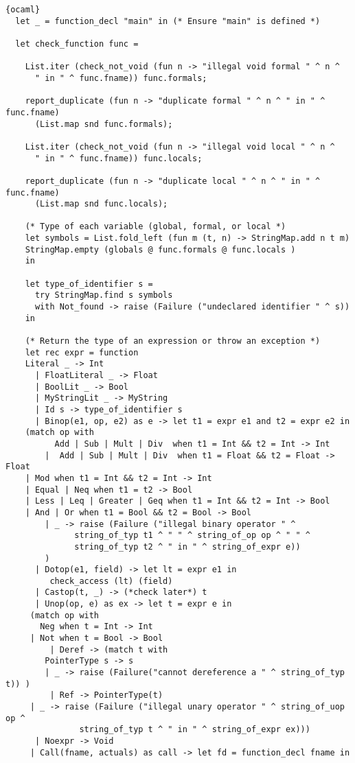\begin{lstlisting}{ocaml}
  let _ = function_decl "main" in (* Ensure "main" is defined *)

  let check_function func =

    List.iter (check_not_void (fun n -> "illegal void formal " ^ n ^
      " in " ^ func.fname)) func.formals;

    report_duplicate (fun n -> "duplicate formal " ^ n ^ " in " ^ func.fname)
      (List.map snd func.formals);

    List.iter (check_not_void (fun n -> "illegal void local " ^ n ^
      " in " ^ func.fname)) func.locals;

    report_duplicate (fun n -> "duplicate local " ^ n ^ " in " ^ func.fname)
      (List.map snd func.locals);

    (* Type of each variable (global, formal, or local *)
    let symbols = List.fold_left (fun m (t, n) -> StringMap.add n t m)
	StringMap.empty (globals @ func.formals @ func.locals )
    in

    let type_of_identifier s =
      try StringMap.find s symbols
      with Not_found -> raise (Failure ("undeclared identifier " ^ s))
    in

    (* Return the type of an expression or throw an exception *)
    let rec expr = function
	Literal _ -> Int
      | FloatLiteral _ -> Float
      | BoolLit _ -> Bool
      | MyStringLit _ -> MyString
      | Id s -> type_of_identifier s
      | Binop(e1, op, e2) as e -> let t1 = expr e1 and t2 = expr e2 in
	(match op with
          Add | Sub | Mult | Div  when t1 = Int && t2 = Int -> Int
        |  Add | Sub | Mult | Div  when t1 = Float && t2 = Float -> Float
	| Mod when t1 = Int && t2 = Int -> Int
	| Equal | Neq when t1 = t2 -> Bool
	| Less | Leq | Greater | Geq when t1 = Int && t2 = Int -> Bool
	| And | Or when t1 = Bool && t2 = Bool -> Bool
        | _ -> raise (Failure ("illegal binary operator " ^
              string_of_typ t1 ^ " " ^ string_of_op op ^ " " ^
              string_of_typ t2 ^ " in " ^ string_of_expr e))
        )
      | Dotop(e1, field) -> let lt = expr e1 in
       	 check_access (lt) (field)
      | Castop(t, _) -> (*check later*) t
      | Unop(op, e) as ex -> let t = expr e in
	 (match op with
	   Neg when t = Int -> Int
	 | Not when t = Bool -> Bool
         | Deref -> (match t with
		PointerType s -> s
		| _ -> raise (Failure("cannot dereference a " ^ string_of_typ t)) )
         | Ref -> PointerType(t) 
	 | _ -> raise (Failure ("illegal unary operator " ^ string_of_uop op ^
	  		   string_of_typ t ^ " in " ^ string_of_expr ex)))
      | Noexpr -> Void
     | Call(fname, actuals) as call -> let fd = function_decl fname in
     

\end{lstlisting}

